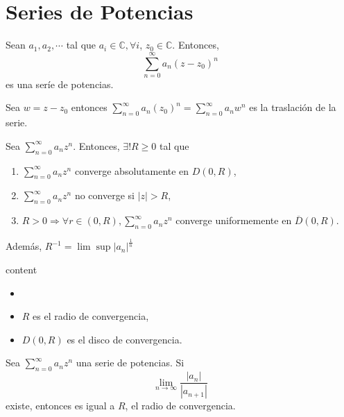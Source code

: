 \section{Series de Potencias}

\begin{defn}
  Sean $a_{1}, a_{2} , \cdots $ tal que $a_{i} \in \mathbb{C}, \forall i$, $z_{0} \in \mathbb{C}$. Entonces,
  \[
    \sum_{n = 0}^{\infty} a_{n}(z - z_{0})^{n}
  \] 
  es una seríe de potencias.
\end{defn}

\begin{obs}
  Sea $w = z - z_{0}$ entonces $\sum_{n = 0}^{\infty} a_{n}( z_{0})^{n} = \sum_{n = 0}^{\infty} a_{n}w^{n}$ es la traslación de la serie.
\end{obs}

\begin{theo}
  Sea $\sum_{n = 0}^{\infty} a_{n}z^{n}$. Entonces, $\exists ! R \geq 0$ tal que
  \begin{enumerate}[label=(\roman*)]
    \item $\sum_{n = 0}^{\infty} a_{n}z^{n}$ converge absolutamente en $D(0, R)$,
    \item $\sum_{n = 0}^{\infty} a_{n}z^{n}$ no converge si $| z | > R$,
    \item $R>0 \Rightarrow \forall r \in (0,R), \sum_{n = 0}^{\infty} a_{n}z^{n}$ converge uniformemente en $\overline{D}(0, R)$.
  \end{enumerate}
  Además, $R^{-1} = \lim \sup | a_{n} |^{\frac{1}{n}}$
\end{theo}

\begin{dem}
  content
\end{dem}

\begin{nota}
  \begin{itemize}
    \item []
    \item $R$ es el radio de convergencia,
    \item $D(0, R)$ es el disco de convergencia.
  \end{itemize}
\end{nota}

\begin{prop}
  Sea $\sum_{n = 0}^{\infty} a_{n}z^{n}$ una serie de potencias. Si
  \[ 
    \lim_{n \to \infty} \frac{\big |a_{n} \big |}{| a_{n+1} |}
  \] 
  existe, entonces es igual a $R$, el radio de convergencia.
\end{prop}

